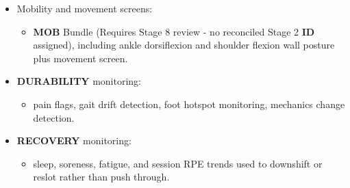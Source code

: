 \documentclass[10pt]{article}
\begin{document}
\begin{itemize}
\item Mobility and movement screens:
  \begin{itemize}
  \item \textbf{MOB} Bundle (Requires Stage 8 review - no reconciled Stage 2 \textbf{ID} assigned), including ankle dorsiflexion and shoulder flexion wall posture plus movement screen.
  \end{itemize}

\item \textbf{DURABILITY} monitoring:
  \begin{itemize}
  \item pain flags, gait drift detection, foot hotspot monitoring, mechanics change detection.
  \end{itemize}

\item \textbf{RECOVERY} monitoring:
  \begin{itemize}
  \item sleep, soreness, fatigue, and session RPE trends used to downshift or reslot rather than push through.
  \end{itemize}
\end{itemize}
\end{document}
